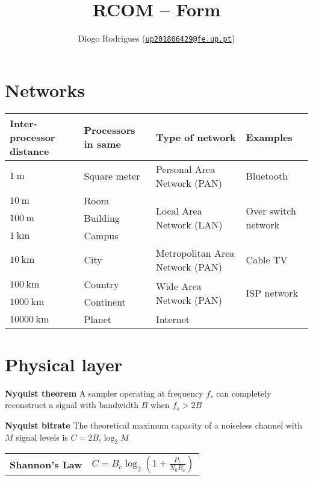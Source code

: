 \documentclass{form}
\author{Diogo Rodrigues (\texttt{\href{mailto:up201806429@fe.up.pt}{up201806429@fe.up.pt}})}
\title{RCOM -- Form}
\begin{document}
\noindent%
\begin{minipage}{0.62\textwidth}
    \section*{Networks}
    \begin{tabular}{@{}p{16mm} | p{21mm} | l | p{19mm}@{}}
        \textbf{Inter-processor distance} & \textbf{Processors in same} & \textbf{Type of network} & \textbf{Examples} \\ \hline
        $\SI{    1}{     \meter}$ & Square meter & Personal Area Network (PAN)               & Bluetooth \\ \hline
        $\SI{   10}{     \meter}$ & Room         & \multirow{3}{*}{Local Area Network (LAN)} & \multirow{3}{19mm}{Over switch network} \\ \cline{1-2}
        $\SI{  100}{     \meter}$ & Building     &                                           & \\ \cline{1-2}
        $\SI{    1}{\kilo\meter}$ & Campus       &                                           & \\ \hline
        $\SI{   10}{\kilo\meter}$ & City         & Metropolitan Area Network (PAN)           & Cable TV \\ \hline
        $\SI{  100}{\kilo\meter}$ & Country      & \multirow{2}{*}{Wide Area Network (PAN)}  & \multirow{2}{*}{ISP network} \\ \cline{1-2}
        $\SI{ 1000}{\kilo\meter}$ & Continent    &                                           & \\ \hline
        $\SI{10000}{\kilo\meter}$ & Planet       & Internet                                  & \\
    \end{tabular}
\end{minipage}%
\begin{minipage}{0.38\textwidth}
    \section*{Physical layer}
    \textbf{Nyquist theorem}
    A sampler operating at frequency $f_s$ can completely reconstruct a signal with bandwidth $B$ when
    $f_s > 2B$
    
    \vspace{0.5em}

    \textbf{Nyquist bitrate}
    The theoretical maximum capacity of a noiseless channel with $M$ signal levels is $C = 2 B_c \log_2{M}$
    
    \begin{tabular}{@{}p{31mm} p{40mm}@{}}
        \textbf{Shannon's Law} & $\displaystyle C = B_c \log_2{\left(1+\frac{P_r}{N_0 B_c}\right)}$
    \end{tabular}
\end{minipage}
\end{document}
